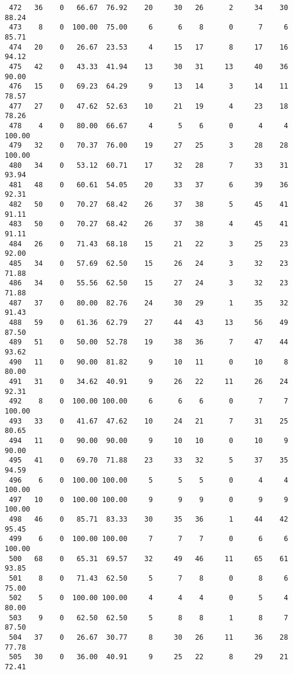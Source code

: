 \begin{verbatim}
 472   36    0   66.67  76.92    20     30   26      2     34    30    88.24
 473    8    0  100.00  75.00     6      6    8      0      7     6    85.71
 474   20    0   26.67  23.53     4     15   17      8     17    16    94.12
 475   42    0   43.33  41.94    13     30   31     13     40    36    90.00
 476   15    0   69.23  64.29     9     13   14      3     14    11    78.57
 477   27    0   47.62  52.63    10     21   19      4     23    18    78.26
 478    4    0   80.00  66.67     4      5    6      0      4     4   100.00
 479   32    0   70.37  76.00    19     27   25      3     28    28   100.00
 480   34    0   53.12  60.71    17     32   28      7     33    31    93.94
 481   48    0   60.61  54.05    20     33   37      6     39    36    92.31
 482   50    0   70.27  68.42    26     37   38      5     45    41    91.11
 483   50    0   70.27  68.42    26     37   38      4     45    41    91.11
 484   26    0   71.43  68.18    15     21   22      3     25    23    92.00
 485   34    0   57.69  62.50    15     26   24      3     32    23    71.88
 486   34    0   55.56  62.50    15     27   24      3     32    23    71.88
 487   37    0   80.00  82.76    24     30   29      1     35    32    91.43
 488   59    0   61.36  62.79    27     44   43     13     56    49    87.50
 489   51    0   50.00  52.78    19     38   36      7     47    44    93.62
 490   11    0   90.00  81.82     9     10   11      0     10     8    80.00
 491   31    0   34.62  40.91     9     26   22     11     26    24    92.31
 492    8    0  100.00 100.00     6      6    6      0      7     7   100.00
 493   33    0   41.67  47.62    10     24   21      7     31    25    80.65
 494   11    0   90.00  90.00     9     10   10      0     10     9    90.00
 495   41    0   69.70  71.88    23     33   32      5     37    35    94.59
 496    6    0  100.00 100.00     5      5    5      0      4     4   100.00
 497   10    0  100.00 100.00     9      9    9      0      9     9   100.00
 498   46    0   85.71  83.33    30     35   36      1     44    42    95.45
 499    6    0  100.00 100.00     7      7    7      0      6     6   100.00
 500   68    0   65.31  69.57    32     49   46     11     65    61    93.85
 501    8    0   71.43  62.50     5      7    8      0      8     6    75.00
 502    5    0  100.00 100.00     4      4    4      0      5     4    80.00
 503    9    0   62.50  62.50     5      8    8      1      8     7    87.50
 504   37    0   26.67  30.77     8     30   26     11     36    28    77.78
 505   30    0   36.00  40.91     9     25   22      8     29    21    72.41

\end{verbatim}
